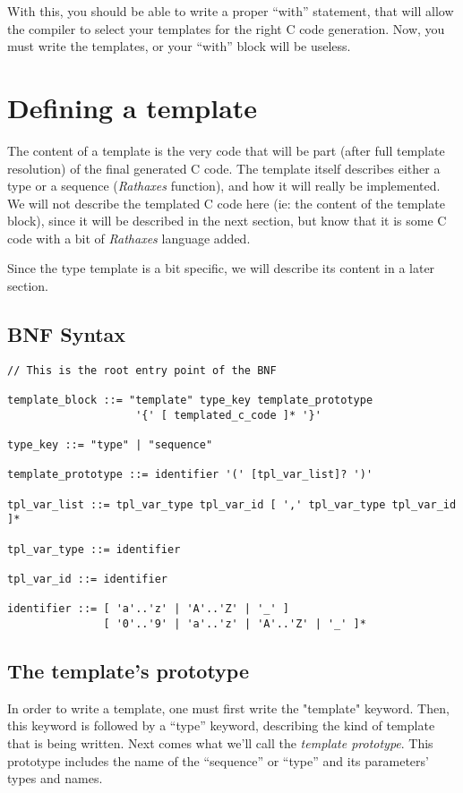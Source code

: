 \documentclass[american]{rtxreport}
\begin{document}
With this, you should be able to write a proper “with” statement, that will
allow the compiler to select your templates for the right C code generation.
Now, you must write the templates, or your “with” block will be useless.


\section{Defining a template}

The content of a template is the very code that will be part (after full
template resolution) of the final generated C code. The template itself
describes either a type or a sequence (\emph{Rathaxes} function), and how it
will really be implemented.  We will not describe the templated C code here
(ie: the content of the template block), since it will be described in the next
section, but know that it is some C code with a bit of \emph{Rathaxes} language
added.

Since the type template is a bit specific, we will describe its content in a
later section.

\subsection{BNF Syntax}

\lstset{}
\begin{lstlisting}
// This is the root entry point of the BNF

template_block ::= "template" type_key template_prototype
                    '{' [ templated_c_code ]* '}'

type_key ::= "type" | "sequence"

template_prototype ::= identifier '(' [tpl_var_list]? ')'

tpl_var_list ::= tpl_var_type tpl_var_id [ ',' tpl_var_type tpl_var_id ]*

tpl_var_type ::= identifier

tpl_var_id ::= identifier

identifier ::= [ 'a'..'z' | 'A'..'Z' | '_' ]
               [ '0'..'9' | 'a'..'z' | 'A'..'Z' | '_' ]*

\end{lstlisting}

\subsection{The template's prototype}

In order to write a template, one must first write the "template" keyword.
Then, this keyword is followed by a “type” keyword, describing the kind of
template that is being written. Next comes what we'll call the \emph{template
prototype}. This prototype includes the name of the “sequence” or “type” and its
parameters' types and names.
\end{document}
